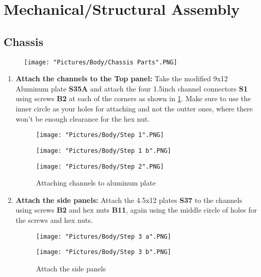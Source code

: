 \documentclass[12pt]{article}
\begin{document}
\newpage

\section{Mechanical/Structural Assembly}
\subsection{Chassis}

\begin{figure}[H]
	\centering
	\texttt{[image: "Pictures/Body/Chassis Parts".PNG]}
\end{figure}

\begin{enumerate}
\item \textbf{Attach the channels to the Top panel: } Take the modified 9x12 Aluminum plate \textbf{S35A} and attach the four 1.5inch channel connectors \textbf{S1} using screws \textbf{B2} at each of the corners as shown in \ref{channel to al plate}. Make sure to use the inner circle as your holes for attaching and not the outter ones, where there won't be enough clearance for the hex nut. 

\begin{figure}[H]
  	\centering
  	\begin{minipage}[b]{0.20\textwidth}
    		\texttt{[image: "Pictures/Body/Step 1".PNG]}
  	\end{minipage}
  	\hfill
  	\begin{minipage}[b]{0.30\textwidth}
    		\texttt{[image: "Pictures/Body/Step 1 b".PNG]}
  	\end{minipage}
    	\hfill
  	\begin{minipage}[b]{0.40\textwidth}
    		\texttt{[image: "Pictures/Body/Step 2".PNG]}
  	\end{minipage}
  	\caption{Attaching channels to aluminum plate}
	\label{channel to al plate}
\end{figure}

\item \textbf{Attach the side panels: } Attach the 4.5x12 plates \textbf{S37} to the channels using screws \textbf{B2} and hex nuts \textbf{B11}, again using the middle circle of holes for the screws and hex nuts. 

\begin{figure}[H]
 	\centering
 	\begin{minipage}[b]{0.45\textwidth}
    		\texttt{[image: "Pictures/Body/Step 3 a".PNG]}
  	\end{minipage}
  	\hfill
  	\begin{minipage}[b]{0.45\textwidth}
    		\texttt{[image: "Pictures/Body/Step 3 b".PNG]}
  	\end{minipage}
  	\caption{Attach the side panels}
	\label{Body side panels}
\end{figure}


\end{enumerate}
\end{document}
